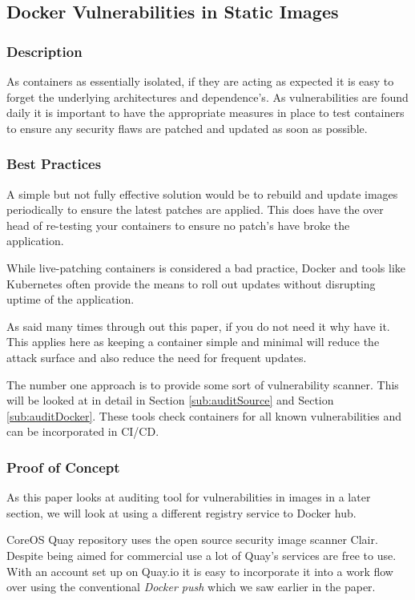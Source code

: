 \subsection{Docker Vulnerabilities in Static Images}
\label{sub:static-image}
\subsubsection{Description}
As containers as essentially isolated, if they are acting as expected it is easy to forget the underlying architectures and dependence's. As vulnerabilities are found daily it is important to have the appropriate measures in place to test containers to ensure any security flaws are patched and updated as soon as possible.
\subsubsection{Best Practices}
A simple but not fully effective solution would be to rebuild and update images periodically to ensure the latest patches are applied. This does have the over head of re-testing your containers to ensure no patch's have broke the application. 

While live-patching containers is considered a bad practice, Docker and tools like Kubernetes often provide the means to roll out updates without disrupting uptime of the application.

As said many times through out this paper, if you do not need it why have it. This applies here as keeping a container simple and minimal will reduce the attack surface and also reduce the need for frequent updates.

The number one approach is to provide some sort of vulnerability scanner. This will be looked at in detail in Section \ref{sub:auditSource} and Section \ref{sub:auditDocker}. These tools check containers for all known vulnerabilities and can be incorporated in CI/CD.
\subsubsection{Proof of Concept}
As this paper looks at auditing tool for vulnerabilities in images in a later section, we will look at using a different registry service to Docker hub. 

CoreOS Quay repository uses the open source security image scanner Clair. Despite being aimed for commercial use a lot of Quay's services are free to use. With an account set up on Quay.io it is easy to incorporate it into a work flow over using the conventional \textit{Docker push} which we saw earlier in the paper. 

